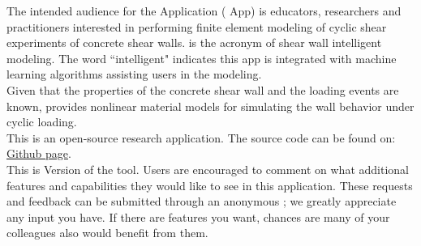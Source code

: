 The intended audience for the \texttt{\getsoftwarename{}} Application (\texttt{\getsoftwarename{}} App) is educators, researchers and practitioners
interested in performing finite element modeling of cyclic shear experiments of concrete shear walls. \texttt{\getsoftwarename{}}  is the acronym of shear wall intelligent modeling. 
The word ``intelligent" indicates this app is integrated with machine learning algorithms assisting users in the modeling.   \\



Given that the properties of the concrete shear wall and the loading events are known,
 \texttt{\getsoftwarename{}} provides nonlinear material models for simulating the wall behavior under cyclic loading.\\

This is an open-source research application. The source code can be found on: 
 \href{https://github.com/NHERI-SimCenter/SWIM}{\texttt{\getsoftwarename{}}
Github page}.\\


This is Version \getsoftwareversion{} of the tool. Users are
encouraged to comment on what additional features and capabilities
they would like to see in this application. These requests and
feedback can be submitted through an anonymous ; we greatly appreciate any input you have. If there are
features you want, chances are many of your colleagues also would
benefit from them. 
